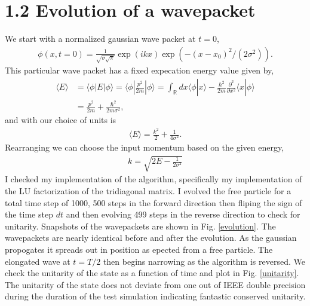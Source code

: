 \documentclass[singlepage,notitlepage,nofootinbib,11pt]{revtex4-1}
\newcommand{\eq}[1]{\begin{align*}#1\end{align*}}
\def\<{\langle}
\def\>{\rangle}
\begin{document}
\section*{1.2 Evolution of a wavepacket}
We start with a normalized gaussian wave packet at $t=0$,
\eq{
\phi(x,t=0) = \frac{1}{\sqrt{\sigma \sqrt{\pi}}}\exp\left(ikx\right)\exp\left(-(x-x_0)^2/\left(2\sigma^2\right)\right).
}
This particular wave packet has a fixed expecation energy value given by,
\begin{align*}
  \<E\> &= \<\phi|E|\phi\> = \<\phi|\frac{p^2}{2m}|\phi\> = \int_{\mathbb{R}}dx\<\phi|x\>-\frac{\hbar^2}{2m}\frac{\partial^2}{\partial x^2}\<x|\phi\> \\
  &= \frac{p^2}{2m} + \frac{\hbar^2}{2 m \sigma^2},
\end{align*}
and with our choice of units is
\eq{
\<E\> = \frac{k^2}{2} +  \frac{1}{4\sigma^2}.
}
Rearranging we can choose the input momentum based on the given energy,
\eq{
k = \sqrt{2 E - \frac{1}{2\sigma^2}}
  }
I checked my implementation of the algorithm, specifically my implementation of the LU factorization of the tridiagonal matrix. I evolved the free particle for a total time step of 1000, 500 steps in the forward direction then fliping the sign of the time step $dt$ and then evolving 499 steps in the reverse direction to check for unitarity. Snapshots of the wavepackets are shown in Fig. \ref{evolution}. The wavepackets are nearly identical before and after the evolution. As the gaussian propogates it spreads out in position as epected from a free particle. The elongated wave at $t=T/2$ then begins narrowing as the algorithm is reversed. We check the unitarity of the state as a function of time and plot in Fig. \ref{unitarity}. The unitarity of the state does not deviate from one out of IEEE double precision during the duration of the test simulation indicating fantastic conserved unitarity.
\end{document}
